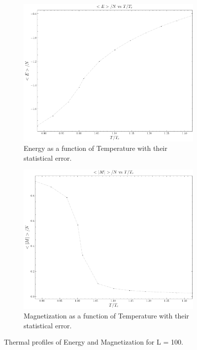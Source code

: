 \documentclass[article]{revtex4}
\begin{document}
\begin{figure}[h!]
\begin{subfigure}{.5\textwidth}
  \centering
  \includegraphics[width=0.7\linewidth]{E_vs_T.png}
  \caption{Energy as a function of Temperature with their statistical error.}
\end{subfigure}%
\begin{subfigure}{.5\textwidth}
  \centering
  \includegraphics[width=0.7\linewidth]{M_vs_T.png}
  \caption{Magnetization as a function of Temperature with their statistical error.}
\end{subfigure}
\caption{Thermal profiles of Energy and Magnetization for L = 100.}
\end{figure}
\end{document}
